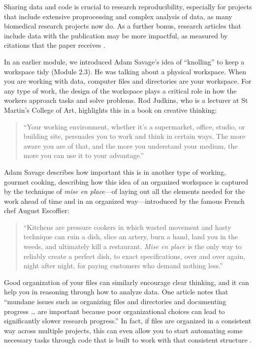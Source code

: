 \documentclass[]{tufte-book}
\begin{document}
Sharing data and code is crucial to research reproducibility, especially for
projects that include extensive proprocessing and complex analysis of data, as
many biomedical research projects now do. As a further bonus, research articles
that include data with the publication may be more impactful, as measured by
citations that the paper receives \citep{marwick2018packaging}.

In an earlier module, we introduced Adam Savage's idea of ``knolling'' to keep a
workspace tidy (Module 2.3). He was talking about a physical workspace. When
you are working with data, computer files and directories are your workspace.
For any type of work, the design of the workspace plays a critical role in
how the workers approach tasks and solve problems. Rod Judkins, who is a
lecturer at St Martin's College of Art, highlights this in a book on
creative thinking:

\begin{quote}
``Your working environment, whether it's a supermarket, office, studio, or
building site, persuades you to work and think in certain ways. The more aware
you are of that, and the more you understand your medium, the more you can use
it to your advantage.'' \citep{judkins2016art}
\end{quote}

Adam Savage describes how important this is in another type of working, gourmet
cooking, describing how this idea of an organized workspace is captured by the
technique of \emph{mise en place}---of laying out all the elements needed for the
work ahead of time and in an organized way---introduced by the famous French
chef August Escoffier:

\begin{quote}
``Kitchens are pressure cookers in which wasted movement and hasty technique
can ruin a dish, slice an artery, burn a hand, land you in the weeds, and
ultimately kill a restaurant. \emph{Mise en place} is the only way to reliably create
a perfect dish, to exact specifications, over and over again, night after night,
for paying customers who demand nothing less.'' \citep{savage2020every}
\end{quote}

Good organization of your files can similarly encourage clear thinking, and it
can help you in reasoning through how to analyze data. One article notes that
``mundane issues such as organizing files and directories and documenting
progress \ldots{} are important because poor organizational choices can lead to
significantly slower research progress.'' \citep{noble2009quick} In fact, if files are
organized in a consistent way across multiple projects, this can even allow you
to start automating some necessary tasks through code that is built to work with
that consistent structure \citep{buffalo2015bioinformatics}.
\end{document}
